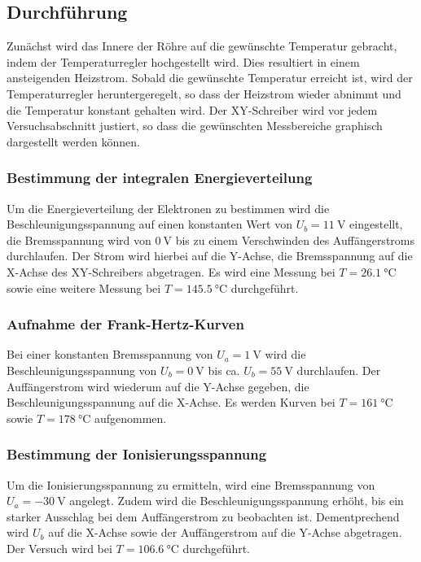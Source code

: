 \subsection{Durchführung}
\label{sec:durchführung}
Zunächst wird das Innere der Röhre auf die gewünschte Temperatur gebracht, indem der Temperaturregler hochgestellt wird.
Dies resultiert in einem ansteigenden Heizstrom.
Sobald die gewünschte Temperatur erreicht ist, wird der Temperaturregler heruntergeregelt, so dass der Heizstrom wieder abnimmt und die Temperatur konstant gehalten wird.
Der XY-Schreiber wird vor jedem Versuchsabschnitt justiert, so dass die gewünschten Messbereiche graphisch dargestellt werden können.

\subsubsection{Bestimmung der integralen Energieverteilung}
Um die Energieverteilung der Elektronen zu bestimmen wird die Beschleunigungsspannung auf einen konstanten Wert von $U_b = \SI{11}{\volt}$ eingestellt, die Bremsspannung wird von $\SI{0}{\volt}$ bis zu einem Verschwinden des Auffängerstroms durchlaufen.
Der Strom wird hierbei auf die Y-Achse, die Bremsspannung auf die X-Achse des XY-Schreibers abgetragen.
Es wird eine Messung bei $T = \SI{26.1}{\celsius}$ sowie eine weitere Messung bei $T = \SI{145.5}{\celsius}$ durchgeführt.

\subsubsection{Aufnahme der Frank-Hertz-Kurven}
Bei einer konstanten Bremsspannung von $U_a = \SI{1}{\volt}$ wird die Beschleunigungsspannung von $U_b = \SI{0}{\volt}$ bis ca. $U_b = \SI{55}{\volt}$ durchlaufen.
Der Auffängerstrom wird wiederum auf die Y-Achse gegeben, die Beschleunigungsspannung auf die X-Achse.
Es werden Kurven bei $T = \SI{161}{\celsius}$ sowie $T = \SI{178}{\celsius}$ aufgenommen.

\subsubsection{Bestimmung der Ionisierungsspannung}
Um die Ionisierungsspannung zu ermitteln, wird eine Bremsspannung von $U_a = \SI{-30}{\volt}$ angelegt.
Zudem wird die Beschleunigungsspannung erhöht, bis ein starker Ausschlag bei dem Auffängerstrom zu beobachten ist.
Dementprechend wird $U_b$ auf die X-Achse sowie der Auffängerstrom auf die Y-Achse abgetragen.
Der Versuch wird bei $T = \SI{106.6}{\celsius}$ durchgeführt.
